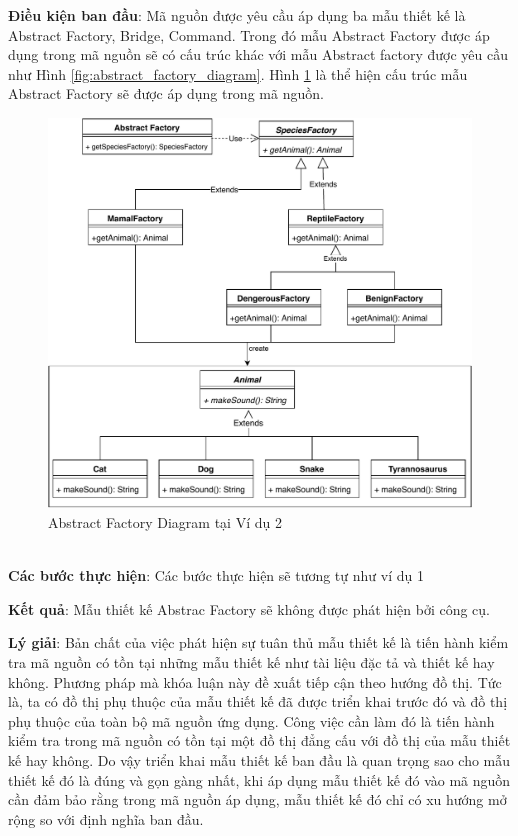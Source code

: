 \documentclass[12pt]{report}
\begin{document}
\noindent \textbf{Điều kiện ban đầu}: Mã nguồn được yêu cầu áp dụng ba mẫu thiết kế là Abstract Factory, Bridge, Command. Trong đó mẫu Abstract Factory được áp dụng trong mã nguồn sẽ có cấu trúc khác với mẫu Abstract factory được yêu cầu như Hình \ref{fig:abstract_factory_diagram}. Hình \ref{fig:abstract_factory_diaram_2} là thể hiện cấu trúc mẫu Abstract Factory sẽ được áp dụng trong mã nguồn.
\begin{figure}[h]
	\centering
	\includegraphics[scale=.7]{images/_abstract_factory_2.pdf}
	\caption{Abstract Factory Diagram tại Ví dụ 2}
	\label{fig:abstract_factory_diaram_2}
\end{figure}\\
\noindent \textbf{Các bước thực hiện}: Các bước thực hiện sẽ tương tự như ví dụ 1 

\noindent \textbf{Kết quả}: Mẫu thiết kế Abstrac Factory sẽ không được phát hiện bởi công cụ.

\noindent \textbf{Lý giải}: Bản chất của việc phát hiện sự tuân thủ mẫu thiết kế là tiến hành kiểm tra mã nguồn có tồn tại những mẫu thiết kế như tài liệu đặc tả và thiết kế hay không. Phương pháp mà khóa luận này đề xuất tiếp cận theo hướng đồ thị. Tức là, ta có đồ thị phụ thuộc của mẫu thiết kế đã được triển khai trước đó và đồ thị phụ thuộc của toàn bộ mã nguồn ứng dụng. Công việc cần làm đó là tiến hành kiểm tra trong mã nguồn có tồn tại một đồ thị đẳng cấu với đồ thị của mẫu thiết kế hay không.
Do vậy triển khai mẫu thiết kế ban đầu là quan trọng sao cho mẫu thiết kế đó là đúng và gọn gàng nhất, khi áp dụng mẫu thiết kế đó vào mã nguồn cần đảm bảo rằng trong mã nguồn áp dụng, mẫu thiết kế đó chỉ có xu hướng mở rộng so với định nghĩa ban đầu.
\end{document}
